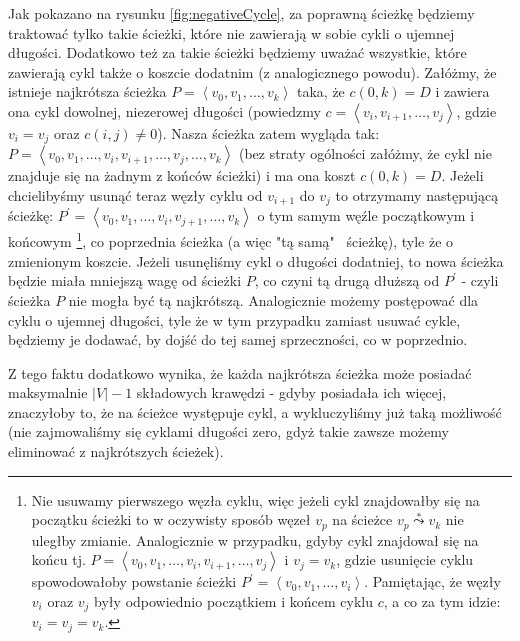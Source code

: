 Jak pokazano na rysunku \ref{fig:negativeCycle}, za poprawną ścieżkę będziemy traktować tylko takie ścieżki, które nie zawierają w sobie cykli o ujemnej długości. Dodatkowo też za takie ścieżki będziemy uważać wszystkie, które zawierają cykl także o koszcie dodatnim (z analogicznego powodu). Załóżmy, że istnieje najkrótsza ścieżka $P = \left \langle v_{0}, v_{1}, \ldots, v_{k} \right \rangle $ taka, że $c \left( 0, k \right) = D$ i zawiera ona cykl dowolnej, niezerowej długości (powiedzmy $c = \left \langle v_{i}, v_{i+1}, \ldots, v_{j} \right \rangle $, gdzie $v_{i} = v_{j} $ oraz $c \left( i, j \right) \neq 0$). Nasza ścieżka zatem wygląda tak: $P = \left \langle v_{0}, v_{1}, \ldots, v_{i}, v_{i+1}, \ldots, v_{j}, \ldots, v_{k} \right \rangle $ (bez straty ogólności załóżmy, że cykl nie znajduje się na żadnym z końców ścieżki) i ma ona koszt $c \left( 0, k \right) = D$. Jeżeli chcielibyśmy usunąć teraz węzły cyklu od $v_{i+1}$ do $v_{j}$ to otrzymamy następującą ścieżkę: $P^{'} = \left \langle v_{0}, v_{1}, \ldots, v_{i}, v_{j+1}, \ldots, v_{k} \right \rangle $ o tym samym węźle początkowym i końcowym \footnote{Nie usuwamy pierwszego węzła cyklu, więc jeżeli cykl znajdowałby się na początku ścieżki to w oczywisty sposób węzeł $v_{p}$ na ścieżce $v_{p} \overset{*}\leadsto v_{k}$ nie uległby zmianie. Analogicznie w przypadku, gdyby cykl znajdował się na końcu tj. $P = \left \langle v_{0}, v_{1}, \ldots, v_{i}, v_{i+1}, \ldots, v_{j} \right \rangle $ i $v_{j}=v_{k}$, gdzie usunięcie cyklu spowodowałoby powstanie ścieżki  $P^{'} = \left \langle v_{0}, v_{1}, \ldots, v_{i} \right \rangle $. Pamiętając, że węzły $v_{i}$ oraz $v_{j}$ były odpowiednio początkiem i końcem cyklu $c$, a co za tym idzie: $v_{i} = v_{j} = v_{k} $.}, co poprzednia ścieżka (a więc "tą samą"~ ścieżkę), tyle że o zmienionym koszcie. Jeżeli usunęliśmy cykl o długości dodatniej, to nowa ścieżka będzie miała mniejszą wagę od ścieżki $P$, co czyni tą drugą dłuższą od $P^{'}$ - czyli ścieżka $P$ nie mogła być tą najkrótszą. Analogicznie możemy postępować dla cyklu o ujemnej długości, tyle że w tym przypadku zamiast usuwać cykle, będziemy je dodawać, by dojść do tej samej sprzeczności, co w poprzednio.

Z tego faktu dodatkowo wynika, że każda najkrótsza ścieżka może posiadać maksymalnie $\left| V \right| - 1$ składowych krawędzi - gdyby posiadała ich więcej, znaczyłoby to, że na ścieżce występuje cykl, a wykluczyliśmy już taką możliwość (nie zajmowaliśmy się cyklami długości zero, gdyż takie zawsze możemy eliminować z najkrótszych ścieżek).

